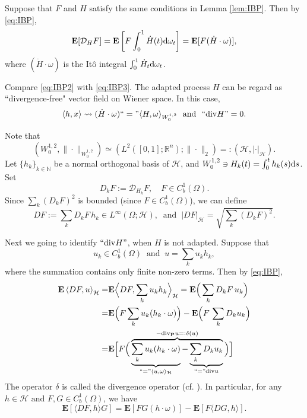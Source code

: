 \documentclass[twoside, 12pt]{book}
\numberwithin{equation}{chapter}
\def\cD{{\mathcal D}}
\def\cH{{\mathcal H}}
\def\mN{{\mathbb N}}
\def\mR{{\mathbb R}}
\def\bE{{\mathbf E}}
\def\bP{{\mathbf P}}
\def\l{\left}
\def\r{\right}
\def\<{\langle}
\def\>{\rangle}
\def\d{\text{\rm{d}}}
\def\div{\mathord{{\rm div}}}
\begin{document}
    Suppose that $F$ and $H$ satisfy the same conditions in Lemma \ref{lem:IBP}. Then by \eqref{eq:IBP}, 
    \begin{equation}\label{eq:IBP3}
    	\bE [\cD_H F]= \mathbf{E}\left[F  \int_0^1 \dot H(t) \d\omega_t\right]=\bE [F (\dot H\cdot \omega)], 
    \end{equation}
    where $(\dot H\cdot \omega)$ is the It\^o integral $\int_0^1 \dot H_t\d \omega_t$. 
    
    Compare \eqref{eq:IBP2} with \eqref{eq:IBP3}. 
    The adapted process $H$ can be regard as ``divergence-free" vector field on Wiener space. In this case, 
    \[
    \<h,x\> \rightsquigarrow  (\dot H \cdot \omega)``="\< H,  \omega\>_{W^{1,2}_0}~ \mbox{ and }~ ``\div H"=0.
    \]  
    
    \medspace
    
    Note that 
    \[
    (W^{1,2}_0, \|\cdot\|_{W^{1,2}_0})\simeq (L^2([0,1];\mR^n); \|\cdot\|_2)=:( \cH, |\cdot|_{ \cH}). 
    \]
    Let $\{h_k\}_{k\in \mN}$ be a normal orthogonal basis of $\cH$, and $W^{1,2}_0 \ni H_k(t)=\int_0^t h_k(s) \d s$.  Set 
    \[
        D_kF:=\cD_{H_k}F, \quad F\in C_b^1(\Omega). 
    \]
    Since $\sum_k ({D_k}F)^2$ is bounded (since $F\in C_b^1(\Omega)$), we can define 
    \[
        D F:= \sum_k D_k F \, h_k\in L^\infty(\Omega; \cH), ~\mbox{ and }~ |DF|_{\cH}= \sqrt{\sum_k ({D_k}F)^2}. 
    \]
    
     Next we going to identify $``\div H"$, when $H$ is not adapted. Suppose that 
     \[
          u_k\in C^1_b(\Omega)~\mbox{ and }~ u= \sum_{k} u_k h_k,
     \] 
     where the summation contains only finite non-zero terms. Then by \eqref{eq:IBP}, 
    \[
    \begin{aligned}
    	\bE \l\<DF, u\r\>_{\cH} =&\bE \Big\<DF, \sum_{k} u_k h_k\Big\>_{\cH} = \bE \Big(\sum_{k} D_k F\, u_k \Big)\\
    	=& \bE \Big(F \sum_{k} u_k  (h_k \cdot \omega) \Big) - \bE \Big(F\, \sum_{k} D_{k} u_k\Big)\\
    	=& \bE \Big[ F \Big( \overbrace{  \underbrace{\sum_{k} u_k  (h_k\cdot\omega) }_{``="\<u,\omega\>_{\cH}}-  \underbrace{\sum_{k} D_{k} u_k}_{``="\div u}  }^{-\div_{\bP} u=:\delta(u)} \Big)\Big]
    \end{aligned}
    \]
    The operator $\delta$ is called the divergence operator (cf. \cite{nualart2006malliavin}). In particular, for any $h\in \cH \mbox{ and } F,G\in C^1_b(\Omega)$, we have 
    \begin{equation}
    	\bE [\<DF, h\>G]=\bE [ FG(h\cdot \omega)]-\bE[F\<DG,h\>]. 
    \end{equation}
    
\end{document}
